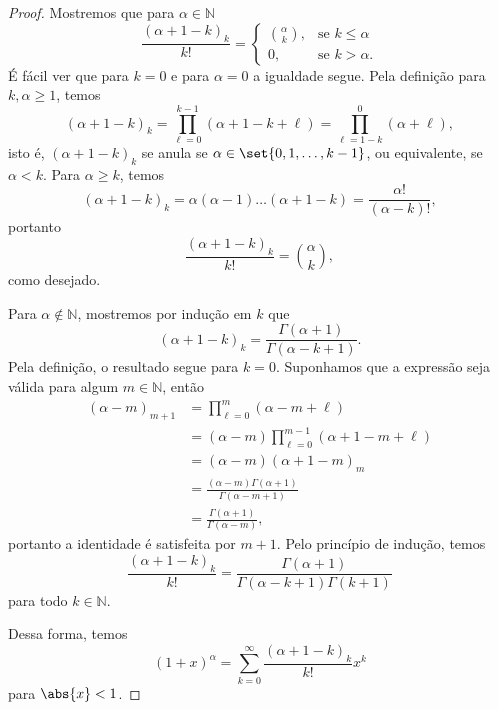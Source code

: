 \begin{proof}
    Mostremos que para \(\alpha \in \mathbb{N}\)
    \begin{equation*}
        \frac{(\alpha + 1 - k)_k}{k!} = \begin{cases}
            \binom{\alpha}{k},&\text{se } k \leq \alpha\\
            0,&\text{se } k > \alpha.
        \end{cases}
    \end{equation*}
    É fácil ver que para \(k = 0\) e para \(\alpha = 0\) a igualdade segue. Pela definição para \(k,\alpha \geq 1\), temos
    \begin{equation*}
        (\alpha + 1 - k)_k = \prod_{\ell=0}^{k-1} (\alpha + 1 - k + \ell) = \prod_{\ell=1-k}^{0} (\alpha + \ell),
    \end{equation*}
    isto é, \((\alpha + 1 - k)_k\) se anula se \(\alpha \in \set{0, 1, \dots, k-1}\), ou equivalente, se \(\alpha < k\). Para \(\alpha \geq k\), temos
    \begin{equation*}
        (\alpha + 1 - k)_k = \alpha (\alpha - 1) \dots (\alpha + 1 - k) = \frac{\alpha!}{(\alpha - k)!},
    \end{equation*}
    portanto
    \begin{equation*}
        \frac{(\alpha + 1 - k)_k}{k!} = \binom{\alpha}{k},
    \end{equation*}
    como desejado.

    Para \(\alpha \notin \mathbb{N}\), mostremos por indução em \(k\) que
    \begin{equation*}
        (\alpha + 1 - k)_k = \frac{\Gamma(\alpha + 1)}{\Gamma(\alpha - k + 1)}.
    \end{equation*}
    Pela definição, o resultado segue para \(k = 0\). Suponhamos que a expressão seja válida para algum \(m \in \mathbb{N}\), então
    \begin{align*}
        (\alpha - m)_{m+1} &= \prod_{\ell = 0}^{m} (\alpha - m + \ell)\\
                           &= (\alpha - m)\prod_{\ell = 0}^{m-1} (\alpha + 1 - m + \ell)\\
                           &= (\alpha - m)(\alpha + 1 - m)_m\\
                           &= \frac{(\alpha - m)\Gamma(\alpha + 1)}{\Gamma(\alpha - m + 1)}\\
                           &= \frac{\Gamma(\alpha + 1)}{\Gamma(\alpha - m)},
    \end{align*}
    portanto a identidade é satisfeita por \(m + 1\). Pelo princípio de indução, temos
    \begin{equation*}
        \frac{(\alpha + 1 - k)_k}{k!} = \frac{\Gamma(\alpha + 1)}{\Gamma(\alpha - k + 1)\Gamma(k + 1)}
    \end{equation*}
    para todo \(k \in \mathbb{N}\).

    Dessa forma, temos
    \begin{equation*}
        (1 + x)^\alpha = \sum_{k=0}^{\infty}\frac{(\alpha + 1 - k)_k}{k!}x^k
    \end{equation*}
    para \(\abs{x} < 1\).
\end{proof}
